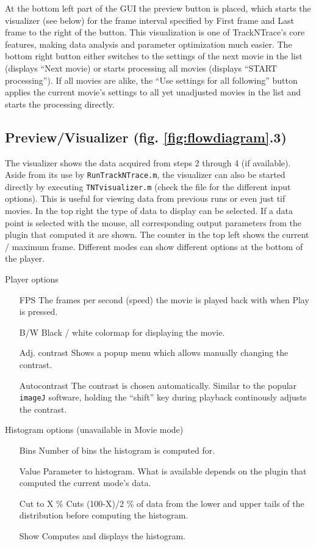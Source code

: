 \documentclass[11pt,onside]{report}
\numberwithin{equation}{chapter}
\begin{document}
At the bottom left part of the GUI the preview button is placed, which starts the visualizer (see below) for the frame interval specified by   \textsf{First frame} and \textsf{Last frame} to the right of the button. This visualization is one of TrackNTrace's core features, making data analysis and parameter optimization much easier. The bottom right button either switches to the settings of the next movie in the list (displays ``\textsf{Next movie}) or starts processing all movies (displays ``\textsf{START processing}''). If all movies are alike, the ``\textsf{Use settings for all following}'' button applies the current movie's settings to all yet unadjusted movies in the list and starts the processing directly.

\subsection*{Preview/Visualizer (fig. \ref{fig:flowdiagram}.3)}
The visualizer shows the data acquired from steps 2 through 4 (if available). Aside from its use by \texttt{RunTrackNTrace.m}, the visualizer can also be started directly by executing \texttt{TNTvisualizer.m} (check the file for the different input options). This is useful for viewing data from previous runs or even just tif movies.  In the top right the type of data to display can be selected. If a data point is selected with the mouse, all corresponding output parameters from the plugin that computed it are shown. The counter in the top left shows the current / maximum frame. Different modes can show different options at the bottom of the player.  \newline 

\textsf{Player options}
\begin{itemize}[leftmargin=3cm]
\item[FPS] The frames per second (speed) the movie is played back with when \textsf{Play} is pressed.
\item[B/W] Black / white colormap for displaying the movie.
\item[Adj. contrast] Shows a popup menu which allows manually changing the contrast.
\item[Autocontrast] The contrast is chosen automatically. Similar to the popular \texttt{imageJ} software, holding the ``shift'' key during playback continously adjusts the contrast.
\newline
\end{itemize} 


\textsf{Histogram options (unavailable in \textsf{Movie} mode)}
\begin{itemize}[leftmargin=3cm]
\item[Bins] Number of bins the histogram is computed for.
\item[Value] Parameter to histogram. What is available depends on the plugin that computed the current mode's data.
\item[Cut to X \%] Cuts (100-X)/2 \% of data from the lower and upper tails of the distribution before computing the histogram. 
\item[Show] Computes and displays the histogram.
\newline
\end{itemize}
\end{document}
